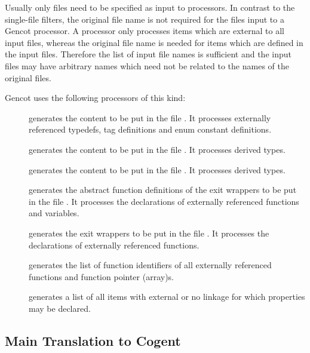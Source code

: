 Usually only  files need to be specified as input to processors.
In contrast to the single-file filters, the original file name is not required for the files input to a 
Gencot processor. A processor only processes items which are external to all input files, whereas the original
file name is needed for items which are defined in the input files. Therefore the list of input file names is
sufficient and the input files may have arbitrary names which need not be related to the names of the original 
 files.

Gencot uses the following processors of this kind:
\begin{description}
\item[] generates the content to be put in the file . It 
processes externally referenced typedefs, tag definitions and enum constant definitions.
\item[] generates the content to be put in the file . It 
processes derived types.
\item[] generates the content to be put in the file . It 
processes derived types.
\item[] generates the abstract function definitions of the exit wrappers to be put in the file 
. It processes the declarations of externally referenced functions and variables.
\item[] generates the exit wrappers to be put in the file . It processes
the declarations of externally referenced functions.
\item[] generates the list of function identifiers of all externally referenced functions and
function pointer (array)s.
\item[] generates a list of all items with external or no linkage 
for which properties may be declared.
\end{description}

\subsection{Main Translation to Cogent}
\label{impl-ccomps-main}

